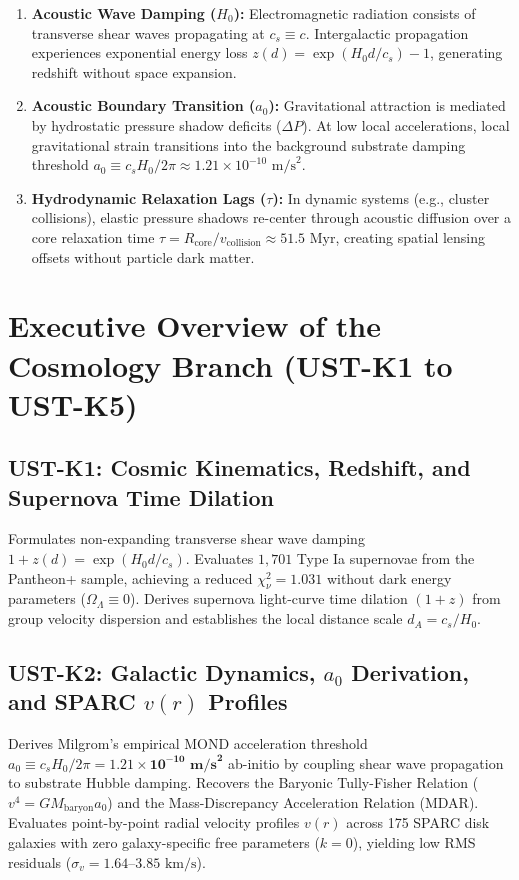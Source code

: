 \documentclass[11pt,a4paper]{article}
\begin{document}
	\begin{enumerate}
		\item \textbf{Acoustic Wave Damping ($H_0$):} Electromagnetic radiation consists of transverse shear waves propagating at $c_s \equiv c$. Intergalactic propagation experiences exponential energy loss $z(d) = \exp(H_0 d / c_s) - 1$, generating redshift without space expansion.
		\item \textbf{Acoustic Boundary Transition ($a_0$):} Gravitational attraction is mediated by hydrostatic pressure shadow deficits ($\Delta P$). At low local accelerations, local gravitational strain transitions into the background substrate damping threshold $a_0 \equiv c_s H_0 / 2\pi \approx 1.21 \times 10^{-10} \text{ m/s}^2$.
		\item \textbf{Hydrodynamic Relaxation Lags ($\tau$):} In dynamic systems (e.g., cluster collisions), elastic pressure shadows re-center through acoustic diffusion over a core relaxation time $\tau = R_{\text{core}} / v_{\text{collision}} \approx 51.5 \text{ Myr}$, creating spatial lensing offsets without particle dark matter.
	\end{enumerate}
	
	\section{Executive Overview of the Cosmology Branch (UST-K1 to UST-K5)}
	\label{sec:paper_overviews}
	
	\subsection{UST-K1: Cosmic Kinematics, Redshift, and Supernova Time Dilation}
	Formulates non-expanding transverse shear wave damping $1 + z(d) = \exp(H_0 d / c_s)$. Evaluates $1,701$ Type Ia supernovae from the Pantheon+ sample, achieving a reduced $\chi^2_\nu = 1.031$ without dark energy parameters ($\Omega_\Lambda \equiv 0$). Derives supernova light-curve time dilation $(1+z)$ from group velocity dispersion and establishes the local distance scale $d_A = c_s / H_0$.
	
	\subsection{UST-K2: Galactic Dynamics, $a_0$ Derivation, and SPARC $v(r)$ Profiles}
	Derives Milgrom's empirical MOND acceleration threshold $a_0 \equiv c_s H_0 / 2\pi = \mathbf{1.21 \times 10^{-10} \text{ m/s}^2}$ ab-initio by coupling shear wave propagation to substrate Hubble damping. Recovers the Baryonic Tully-Fisher Relation ($v^4 = G M_{\text{baryon}} a_0$) and the Mass-Discrepancy Acceleration Relation (MDAR). Evaluates point-by-point radial velocity profiles $v(r)$ across 175 SPARC disk galaxies with zero galaxy-specific free parameters ($k=0$), yielding low RMS residuals ($\sigma_v = 1.64\text{--}3.85 \text{ km/s}$).
	
\end{document}
